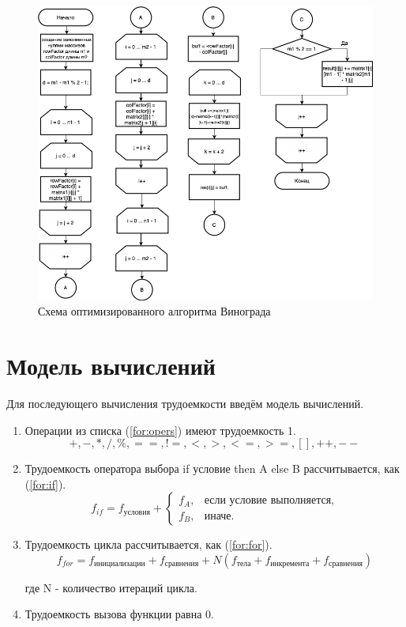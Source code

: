 \documentclass[12pt]{report}
\begin{document}
\begin{figure}[h!p]\label{vinOptScheme}
	\centering
	\includegraphics[scale = 0.65]{vinOpt.drawio.png}
	\caption{Схема оптимизированного алгоритма Винограда}
	\label{fig:grapesOpt}
\end{figure}


\section{Модель вычислений}

Для последующего вычисления трудоемкости введём модель вычислений.

\begin{enumerate}
	\item Операции из списка (\ref{for:opers}) имеют трудоемкость 1.
	\begin{equation}
	\label{for:opers}
	+, -, *, /, \%, ==, !=, <, >, <=, >=, [], ++, {-}-
	\end{equation}
	\item Трудоемкость оператора выбора if условие then A else B рассчитывается, как (\ref{for:if}).
	\begin{equation}
	\label{for:if}
	f_{if} = f_{\text{условия}} +
	\begin{cases}
	f_A, & \text{если условие выполняется,}\\
	f_B, & \text{иначе.}
	\end{cases}
	\end{equation}
	\item Трудоемкость цикла рассчитывается, как (\ref{for:for}).
	\begin{equation}
	\label{for:for}
	f_{for} = f_{\text{инициализации}} + f_{\text{сравнения}} + N(f_{\text{тела}} + f_{\text{инкремента}} + f_{\text{сравнения}})
	\end{equation}
	
	где N - количество итераций цикла.
	\item Трудоемкость вызова функции равна 0.
\end{enumerate}
\end{document}
